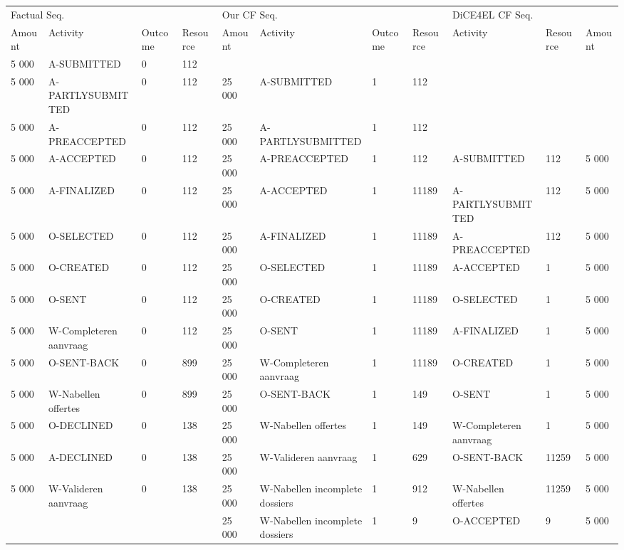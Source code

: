 \begin{tabular}{lllllllllll}
\toprule
\multicolumn{4}{l}{Factual Seq.} & \multicolumn{4}{l}{Our CF Seq.} & \multicolumn{3}{l}{DiCE4EL CF Seq.} \\
Amount & Activity & Outcome & Resource & Amount & Activity & Outcome & Resource & Activity & Resource & Amount \\
\midrule
5 000 & A-SUBMITTED & 0 & 112 &  &  &  &  &  &  &  \\
5 000 & A-PARTLYSUBMITTED & 0 & 112 & 25 000 & A-SUBMITTED & 1 & 112 &  &  &  \\
5 000 & A-PREACCEPTED & 0 & 112 & 25 000 & A-PARTLYSUBMITTED & 1 & 112 &  &  &  \\
5 000 & A-ACCEPTED & 0 & 112 & 25 000 & A-PREACCEPTED & 1 & 112 & A-SUBMITTED & 112 & 5 000 \\
5 000 & A-FINALIZED & 0 & 112 & 25 000 & A-ACCEPTED & 1 & 11189 & A-PARTLYSUBMITTED & 112 & 5 000 \\
5 000 & O-SELECTED & 0 & 112 & 25 000 & A-FINALIZED & 1 & 11189 & A-PREACCEPTED & 112 & 5 000 \\
5 000 & O-CREATED & 0 & 112 & 25 000 & O-SELECTED & 1 & 11189 & A-ACCEPTED & 1 & 5 000 \\
5 000 & O-SENT & 0 & 112 & 25 000 & O-CREATED & 1 & 11189 & O-SELECTED & 1 & 5 000 \\
5 000 & W-Completeren aanvraag & 0 & 112 & 25 000 & O-SENT & 1 & 11189 & A-FINALIZED & 1 & 5 000 \\
5 000 & O-SENT-BACK & 0 & 899 & 25 000 & W-Completeren aanvraag & 1 & 11189 & O-CREATED & 1 & 5 000 \\
5 000 & W-Nabellen offertes & 0 & 899 & 25 000 & O-SENT-BACK & 1 & 149 & O-SENT & 1 & 5 000 \\
5 000 & O-DECLINED & 0 & 138 & 25 000 & W-Nabellen offertes & 1 & 149 & W-Completeren aanvraag & 1 & 5 000 \\
5 000 & A-DECLINED & 0 & 138 & 25 000 & W-Valideren aanvraag & 1 & 629 & O-SENT-BACK & 11259 & 5 000 \\
5 000 & W-Valideren aanvraag & 0 & 138 & 25 000 & W-Nabellen incomplete dossiers & 1 & 912 & W-Nabellen offertes & 11259 & 5 000 \\
 &  &  &  & 25 000 & W-Nabellen incomplete dossiers & 1 & 9 & O-ACCEPTED & 9 & 5 000 \\
\bottomrule
\end{tabular}
